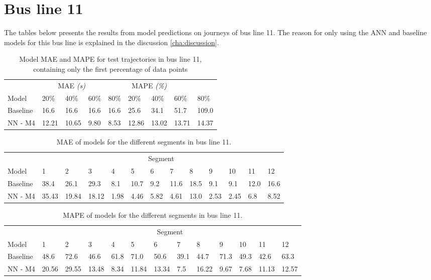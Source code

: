 \section{Bus line 11}
The tables below presents the results from model predictions on journeys of bus line 11. The reason for only using the ANN and baseline models for this bus line is explained in the discussion \ref{cha:discussion}.
\begin{table}[H]
	\centering
	\caption{Model MAE and MAPE for test trajectories in bus line 11, containing only the first percentage of data points}
	\label{tbl:models-mae-and-mape-211}
	\begin{tabular}{l | l | l | l | l || l | l | l | l }
		& \multicolumn{3}{c}{MAE \textit{(s)}} & \multicolumn{4}{c}{MAPE \textit{(\%)}} \\
		Model      & 20\% & 40\% & 60\% & 80\% & 20\% & 40\% & 60\% & 80\% \\
		\hline
		Baseline & 16.6 & 16.6 & 16.6 & 16.6  & 25.6 & 34.1 & 51.7 & 109.0 \\
		NN - M4        & 12.21 &  10.65 & 9.80 &  8.53  & 12.86 & 13.02 & 13.71 & 14.37 \\
	\end{tabular}
\end{table}

\begin{table}[H]
	\centering
	\caption{MAE of models for the different segments in bus line 11.}
	\label{tbl:model-mae-of-segs-211}
	\begin{adjustbox}{center}
	\begin{tabular}{ l | l | l | l | l | l | l | l | l | l | l | l | l}
		& \multicolumn{12}{c}{Segment} \\
		Model       & 1 & 2 & 3 & 4 & 5 & 6 & 7 & 8 & 9 & 10 & 11 & 12 \\
		\hline
		Baseline  & 38.4 & 26.1 & 29.3 & 8.1 & 10.7 & 9.2 & 11.6 & 18.5 & 9.1 & 9.1  & 12.0 & 16.6 \\
		NN - M4         & 35.43& 19.84& 18.12& 1.98& 4.46& 5.82& 4.61& 13.0& 2.53& 2.45& 6.8& 8.52\\
	\end{tabular}
	\end{adjustbox}
\end{table}

\begin{table}[H]
	\centering
	\caption{MAPE of models for the different segments in bus line 11.}
	\label{fig:model-mape-of-segs-211}
	\begin{adjustbox}{center}
	\begin{tabular}{ l | l | l | l | l | l | l | l | l | l | l | l | l}
		& \multicolumn{12}{c}{Segment} \\
		Model       & 1 & 2 & 3 & 4 & 5 & 6 & 7 & 8 & 9 & 10 & 11 & 12 \\
		\hline
		Baseline  & 48.6 & 72.6 & 46.6 & 61.8 & 71.0 & 50.6 & 39.1 & 44.7 & 71.3 & 49.3  & 42.6 & 63.3 \\
		NN - M4         & 20.56& 29.55& 13.48& 8.34& 11.84& 13.34& 7.5& 16.22& 9.67& 7.68& 11.13& 12.57\\
	\end{tabular}
	\end{adjustbox}
\end{table}

